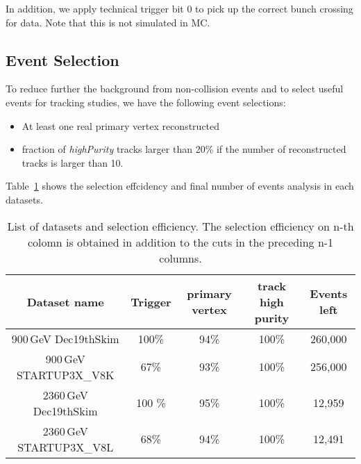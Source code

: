 In addition, we apply technical trigger bit 0 to pick up the correct bunch crossing for data. 
Note that this is not simulated in MC. 

\subsection{Event Selection}

To reduce further the background from non-collision events and to select useful events for tracking studies, 
we have the following event selections: 
\begin{itemize}
\item At least one real primary vertex reconstructed
\item fraction of {\em highPurity} tracks larger than 20\% if the 
number of reconstructed tracks is larger than 10.
\end{itemize}

Table~\ref{tab:datasets} shows the selection effcidency and final number of events analysis 
in each datasets.

\begin{table}[htbH]
\begin{center}
\caption{List of datasets and selection efficiency. 
The selection efficiency on n-th colomn is obtained in addition to the cuts in the preceding n-1 columns.
\label{tab:datasets}}
\begin{tabular}{ccccc}
\hline
\hline
 Dataset name & Trigger & primary vertex & track high purity &  Events left \\
\hline
900\,GeV Dec19thSkim& 100\% & 94\% & 100\% & 260,000 \\
900\,GeV STARTUP3X\_V8K & 67\% & 93\% & 100\% & 256,000 \\
2360\,GeV Dec19thSkim & 100 \% & 95\% & 100\% & 12,959 \\
2360\,GeV STARTUP3X\_V8L & 68\% & 94\% & 100\% & 12,491 \\
\hline
\hline
\end{tabular}
\end{center}
\end{table}
